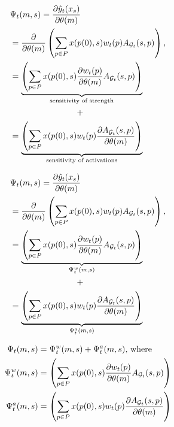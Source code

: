 {\begin{definition}
{\begin{align}
\begin{split}
&\Psi_t(m,s) = \frac{\partial \hat{y}_t(x_s)}{\partial \theta(m)}\\
&=\frac{\partial }{\partial \theta(m)}\left(\sum_{p\in P} x(p(0),s) w_{t}(p) A_{\mathcal{G}_t}(s,p)\right),\\
&=\underbrace{\left(\sum_{p\in P} x(p(0),s) \frac{\partial w_{t}(p)}{\partial \theta(m)} A_{\mathcal{G}_t}(s,p)\right)}_{\text{sensitivity of strength}}\\
&\quad\quad\quad\quad\quad\quad\quad\quad+\\
&=\underbrace{\left(\sum_{p\in P} x(p(0),s) w_{t}(p) \frac{\partial A_{\mathcal{G}_t}(s,p)}{\partial \theta(m)}\right)}_{\text{sensitivity of activations}}
\end{split}
\end{align}

\begin{align}\label{eq:split}
\begin{split}
&\Psi_t(m,s) = \frac{\partial \hat{y}_t(x_s)}{\partial \theta(m)}\\
&=\frac{\partial }{\partial \theta(m)}\left(\sum_{p\in P} x(p(0),s) w_{t}(p) A_{\mathcal{G}_t}(s,p)\right),\\
&=\underbrace{\left(\sum_{p\in P} x(p(0),s) \frac{\partial w_{t}(p)}{\partial \theta(m)} A_{\mathcal{G}_t}(s,p)\right)}_{{\Psi^w_{t}(m,s)}}\\
&\quad\quad\quad\quad\quad\quad\quad\quad+\\
&=\underbrace{\left(\sum_{p\in P} x(p(0),s) w_{t}(p) \frac{\partial A_{\mathcal{G}_t}(s,p)}{\partial \theta(m)}\right)}_{{\Psi^a_t(m,s)}}
\end{split}
\end{align}
}
\begin{align}\label{eq:split}
\begin{split}
\Psi_t(m,s) &= \Psi^w_{t}(m,s)+\Psi^a_{t}(m,s), \,\text{where}\\
\Psi^w_{t}(m,s)&={\left(\sum_{p\in P} x(p(0),s) \frac{\partial w_{t}(p)}{\partial \theta(m)} A_{\mathcal{G}_t}(s,p)\right)}\\
\Psi^a_{t}(m,s)&={\left(\sum_{p\in P} x(p(0),s) w_{t}(p) \frac{\partial A_{\mathcal{G}_t}(s,p)}{\partial \theta(m)}\right)}
\end{split}
\end{align}



\end{definition}}
